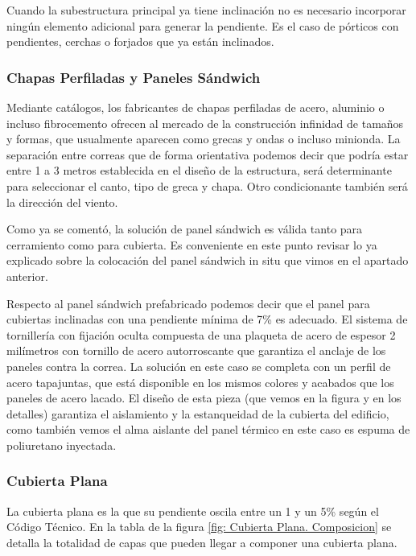 Cuando la subestructura principal ya tiene inclinación no es necesario incorporar ningún elemento adicional para generar la pendiente. Es el caso de pórticos con pendientes, cerchas o forjados que ya están inclinados.

\subsubsection*{Chapas Perfiladas y Paneles Sándwich}

Mediante catálogos, los fabricantes de chapas perfiladas de acero, aluminio o incluso fibrocemento ofrecen al mercado de la construcción infinidad de tamaños y formas, que usualmente aparecen como grecas y ondas o incluso minionda. La separación entre correas que de forma orientativa podemos decir que podría estar entre 1 a 3 metros establecida en el diseño de la estructura, será determinante para seleccionar el canto, tipo de greca y chapa. Otro condicionante también será la dirección del viento.

Como ya se comentó, la solución de panel sándwich es válida tanto para cerramiento como para cubierta. Es conveniente en este punto revisar lo ya explicado sobre la colocación del panel sándwich in situ que vimos en el apartado anterior.

Respecto al panel sándwich prefabricado podemos decir que el panel para cubiertas inclinadas con una pendiente mínima de 7\% es adecuado. El sistema de tornillería con fijación oculta compuesta de una plaqueta de acero de espesor 2 milímetros con tornillo de acero autorroscante que garantiza el anclaje de los paneles contra la correa. La solución en este caso se completa con un perfil de acero tapajuntas, que está disponible en los mismos colores y acabados que los paneles de acero lacado. El diseño de esta pieza (que vemos en la figura y en los detalles) garantiza el aislamiento y la estanqueidad de la cubierta del edificio, como también vemos el alma aislante del panel térmico en este caso es espuma de poliuretano inyectada.

\subsubsection*{Cubierta Plana}

La cubierta plana es la que su pendiente oscila entre un 1 y un 5\% según el Código Técnico. En la tabla de la figura \ref{fig: Cubierta Plana. Composicion} se detalla la totalidad de capas que pueden llegar a componer una cubierta plana.

